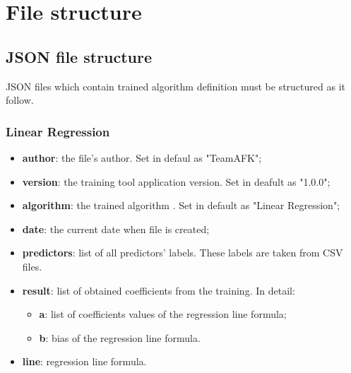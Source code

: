 \section{File structure}
	\subsection{JSON file structure}
JSON files which contain trained algorithm definition must be structured as it follow.	

		\subsubsection{Linear Regression}
		\begin{itemize}
			\item\textbf{author}: the file's author. Set in defaul as "TeamAFK";
			\item\textbf{version}: the training tool application version. Set in deafult as "1.0.0";
			\item\textbf{algorithm}: the trained algorithm . Set in default as "Linear Regression"; 	
			\item\textbf{date}: the current date when file is created;
			\item\textbf{predictors}: list of all predictors' labels. These labels are taken from CSV files.
			\item\textbf{result}: list of obtained coefficients from the training. In detail:
			\begin{itemize}
					\item\textbf{a}: list of coefficients values of the regression line formula;
					\item\textbf{b}: bias of the regression line formula. 
				\end{itemize}
			\item\textbf{line}: regression line formula.
					
		\end{itemize}
		
